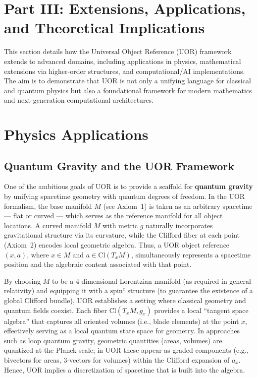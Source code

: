 \documentclass[12pt]{article}
\begin{document}
\section*{Part III: Extensions, Applications, and Theoretical Implications}

This section details how the Universal Object Reference (UOR) framework extends to advanced domains, including applications in physics, mathematical extensions via higher-order structures, and computational/AI implementations. The aim is to demonstrate that UOR is not only a unifying language for classical and quantum physics but also a foundational framework for modern mathematics and next-generation computational architectures.

\section{Physics Applications}

\subsection{Quantum Gravity and the UOR Framework}
One of the ambitious goals of UOR is to provide a scaffold for \textbf{quantum gravity} by unifying spacetime geometry with quantum degrees of freedom. In the UOR formalism, the base manifold $M$ (see Axiom~1) is taken as an arbitrary spacetime --- flat or curved --- which serves as the reference manifold for all object locations. A curved manifold $M$ with metric $g$ naturally incorporates gravitational structure via its curvature, while the Clifford fiber at each point (Axiom~2) encodes local geometric algebra. Thus, a UOR object reference $(x,a)$, where $x \in M$ and $a \in \mathrm{Cl}(T_x M)$, simultaneously represents a spacetime position and the algebraic content associated with that point.

By choosing $M$ to be a 4-dimensional Lorentzian manifold (as required in general relativity) and equipping it with a $\text{spin}^c$ structure (to guarantee the existence of a global Clifford bundle), UOR establishes a setting where classical geometry and quantum fields coexist. Each fiber $\mathrm{Cl}(T_x M, g_x)$ provides a local ``tangent space algebra'' that captures all oriented volumes (i.e., blade elements) at the point $x$, effectively serving as a local quantum state space for geometry. In approaches such as loop quantum gravity, geometric quantities (areas, volumes) are quantized at the Planck scale; in UOR these appear as graded components (e.g., bivectors for areas, 3-vectors for volumes) within the Clifford expansion of $a_x$. Hence, UOR implies a discretization of spacetime that is built into the algebra.
\end{document}
